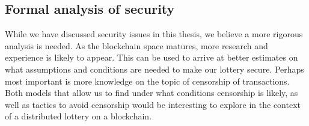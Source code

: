 \subsection{Formal analysis of security}

While we have discussed security issues in this thesis, we believe a more rigorous analysis is needed. As the blockchain space matures, more research and experience is likely to appear. This can be used to arrive at better estimates on what assumptions and conditions are needed to make our lottery secure. Perhaps most important is more knowledge on the topic of censorship of transactions. Both models that allow us to find under what conditions censorship is likely, as well as tactics to avoid censorship would be interesting to explore in the context of a distributed lottery on a blockchain.
